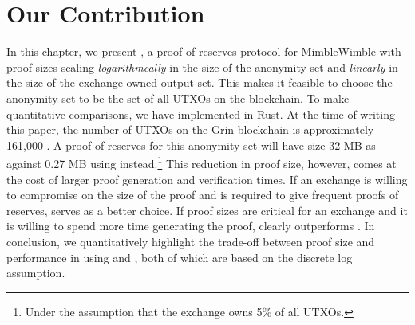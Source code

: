 \section{Our Contribution}
In this chapter, we present \Rplus, a proof of reserves protocol for MimbleWimble with proof sizes scaling \textit{logarithmcally} in the size of the anonymity set and \textit{linearly} in the size of the exchange-owned output set.
This makes it feasible to choose the anonymity set to be the set of all UTXOs on the blockchain.  
To make quantitative comparisons, we have implemented \RB  in Rust.
At the time of writing this paper, the number of UTXOs on the Grin blockchain is approximately 161,000 \cite{GrinScanWebsite}.
A \R proof of reserves for this anonymity set will have size 32 MB as against 0.27 MB using \RPlus instead.\footnote{Under the assumption that the exchange owns 5\% of all UTXOs.}
This reduction in proof size, however, comes at the cost of larger proof generation and verification times. If an exchange is willing to compromise on the size of the proof and is required to give frequent proofs of reserves,
\R serves as a better choice. If proof sizes are critical for an exchange and it is willing to spend more time generating the proof, \RB clearly outperforms \Rw.   
In conclusion, we quantitatively highlight the trade-off between proof size and performance in using \R and \RBw, both of which are based on the discrete log assumption.



%
%
%

